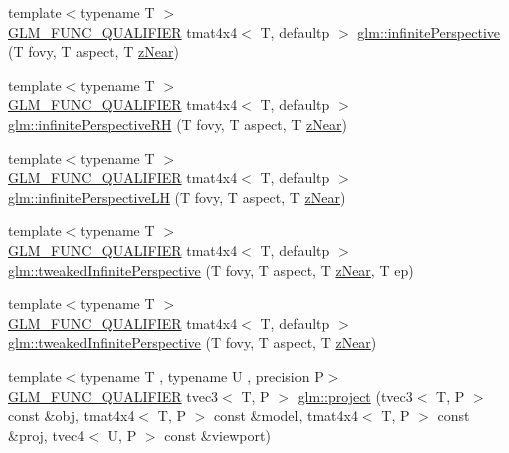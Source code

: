 \begin{DoxyCompactItemize}
\item 
{\footnotesize template$<$typename T $>$ }\\\mbox{\hyperlink{setup_8hpp_a33fdea6f91c5f834105f7415e2a64407}{G\+L\+M\+\_\+\+F\+U\+N\+C\+\_\+\+Q\+U\+A\+L\+I\+F\+I\+ER}} tmat4x4$<$ T, defaultp $>$ \mbox{\hyperlink{group__gtc__matrix__transform_ga79f704ad91a5f0d68abd88c66c8186e5}{glm\+::infinite\+Perspective}} (T fovy, T aspect, T \mbox{\hyperlink{glad_8h_a48b62672ab8e9fe8f51a25e62e7bc888}{z\+Near}})
\item 
{\footnotesize template$<$typename T $>$ }\\\mbox{\hyperlink{setup_8hpp_a33fdea6f91c5f834105f7415e2a64407}{G\+L\+M\+\_\+\+F\+U\+N\+C\+\_\+\+Q\+U\+A\+L\+I\+F\+I\+ER}} tmat4x4$<$ T, defaultp $>$ \mbox{\hyperlink{group__gtc__matrix__transform_ga79575023763df88dff1bf8255a42d0be}{glm\+::infinite\+Perspective\+RH}} (T fovy, T aspect, T \mbox{\hyperlink{glad_8h_a48b62672ab8e9fe8f51a25e62e7bc888}{z\+Near}})
\item 
{\footnotesize template$<$typename T $>$ }\\\mbox{\hyperlink{setup_8hpp_a33fdea6f91c5f834105f7415e2a64407}{G\+L\+M\+\_\+\+F\+U\+N\+C\+\_\+\+Q\+U\+A\+L\+I\+F\+I\+ER}} tmat4x4$<$ T, defaultp $>$ \mbox{\hyperlink{group__gtc__matrix__transform_ga47af534da2b28effa4c7945ec82ccd9d}{glm\+::infinite\+Perspective\+LH}} (T fovy, T aspect, T \mbox{\hyperlink{glad_8h_a48b62672ab8e9fe8f51a25e62e7bc888}{z\+Near}})
\item 
{\footnotesize template$<$typename T $>$ }\\\mbox{\hyperlink{setup_8hpp_a33fdea6f91c5f834105f7415e2a64407}{G\+L\+M\+\_\+\+F\+U\+N\+C\+\_\+\+Q\+U\+A\+L\+I\+F\+I\+ER}} tmat4x4$<$ T, defaultp $>$ \mbox{\hyperlink{group__gtc__matrix__transform_gaa50fce7f50b5d5da881ed30f5532a921}{glm\+::tweaked\+Infinite\+Perspective}} (T fovy, T aspect, T \mbox{\hyperlink{glad_8h_a48b62672ab8e9fe8f51a25e62e7bc888}{z\+Near}}, T ep)
\item 
{\footnotesize template$<$typename T $>$ }\\\mbox{\hyperlink{setup_8hpp_a33fdea6f91c5f834105f7415e2a64407}{G\+L\+M\+\_\+\+F\+U\+N\+C\+\_\+\+Q\+U\+A\+L\+I\+F\+I\+ER}} tmat4x4$<$ T, defaultp $>$ \mbox{\hyperlink{group__gtc__matrix__transform_gaed64bd81f5ecdab52fecbdf7f6b58194}{glm\+::tweaked\+Infinite\+Perspective}} (T fovy, T aspect, T \mbox{\hyperlink{glad_8h_a48b62672ab8e9fe8f51a25e62e7bc888}{z\+Near}})
\item 
{\footnotesize template$<$typename T , typename U , precision P$>$ }\\\mbox{\hyperlink{setup_8hpp_a33fdea6f91c5f834105f7415e2a64407}{G\+L\+M\+\_\+\+F\+U\+N\+C\+\_\+\+Q\+U\+A\+L\+I\+F\+I\+ER}} tvec3$<$ T, P $>$ \mbox{\hyperlink{group__gtc__matrix__transform_gad743556abd138264d4f06f4ca27f1d7e}{glm\+::project}} (tvec3$<$ T, P $>$ const \&obj, tmat4x4$<$ T, P $>$ const \&model, tmat4x4$<$ T, P $>$ const \&proj, tvec4$<$ U, P $>$ const \&viewport)

\end{DoxyCompactItemize}
